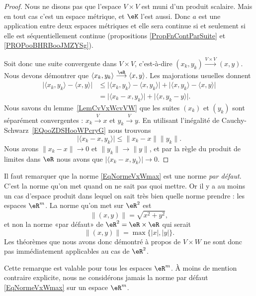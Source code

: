 \begin{proof}
	Nous ne disons pas que l'espace \( V\times V\) est muni d'un produit scalaire. Mais en tout cas c'est un espace métrique, et \( \eK\) l'est aussi. Donc \( a\) est une application entre deux espaces métriques et elle sera continue si et seulement si elle est séquentiellement continue (propositions \ref{PropFnContParSuite} et \ref{PROPooBHRBooJMZYSg}).

	Soit donc une suite convergente dans \( V\times V\), c'est-à-dire \( (x_k,y_k)\stackrel{V\times V}{\longrightarrow}(x,y)\). Nous devons démontrer que \( \langle x_k, y_k\rangle \stackrel{\eR}{\longrightarrow}\langle x, y\rangle \). Les majorations usuelles donnent
	\begin{subequations}
		\begin{align}
			\big| \langle x_k, y_k\rangle -\langle x, y\rangle  \big| & \leq \big| \langle x_k, y_k\rangle -\langle x, y_k\rangle  \big|+\big| \langle x, y_k\rangle -\langle x, y\rangle  \big| \\
			                                                          & =\big| \langle x_k-x, y_k\rangle  \big|+\big| \langle x, y_k-y\rangle  \big|.
		\end{align}
	\end{subequations}
	Nous savons du lemme~\ref{LemCvVxWcvVW} que les suites \( (x_k)\) et \( (y_k)\) sont séparément convergentes : \( x_k\stackrel{V}{\longrightarrow}x\) et \( y_k\stackrel{V}{\longrightarrow}y\). En utilisant l'inégalité de Cauchy-Schwarz~\ref{EQooZDSHooWPcryG} nous trouvons
	\begin{equation}
		\big| \langle x_k-x, y_k\rangle  \big|\leq \| x_k-x \|\| y_k \|.
	\end{equation}
	Nous avons \( \| x_k-x \|\to 0\) et \( \| y_k \|\to \| y \|\), et par la règle du produit de limites dans \( \eR\) nous avons que \( \big| \langle x_k-x, y_k\rangle  \big|\to 0\).
\end{proof}

\begin{remark}      \label{RemTopoProdPasRm}
	Il faut remarquer que la norme \eqref{EqNormeVxWmax} est une norme \emph{par défaut}. C'est la norme qu'on met quand on ne sait pas quoi mettre. Or il y a au moins un cas d'espace produit dans lequel on sait très bien quelle norme prendre : les espaces \( \eR^m\). La norme qu'on met sur \( \eR^2\) est
	\begin{equation}
		\| (x,y) \|=\sqrt{x^2+y^2},
	\end{equation}
	et non la norme «par défaut» de \( \eR^2=\eR\times\eR\) qui serait
	\begin{equation}
		\| (x,y) \|=\max\{ | x |,| y | \}.
	\end{equation}
	Les théorèmes que nous avons donc démontré à propos de \( V\times W\) ne sont donc pas immédiatement applicables au cas de \( \eR^2\).

	Cette remarque est valable pour tous les espaces \( \eR^m\). À moins de mention contraire explicite, nous ne considérons jamais la norme par défaut \eqref{EqNormeVxWmax} sur un espace \( \eR^m\).
\end{remark}

